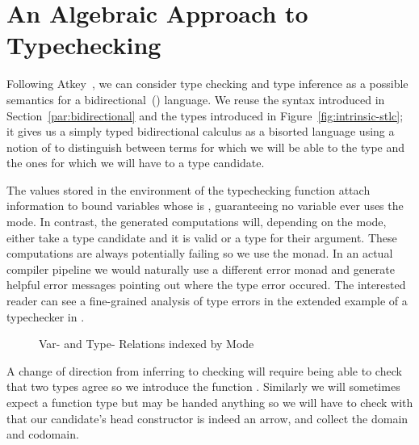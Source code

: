 \section{An Algebraic Approach to Typechecking}\label{section:typechecking}

Following Atkey~\citeyear{atkey2015algebraic}, we can consider type checking
and type inference as a possible semantics for a bidirectional~(\cite{pierce2000local})
language. We reuse the syntax introduced in Section~\ref{par:bidirectional}
and the types introduced in Figure~\ref{fig:intrinsic-stlc}; it
gives us a simply typed bidirectional calculus as a bisorted language using
a notion of  to distinguish between terms for which we will be able to
 the type and the ones for which we will have to  a type
candidate.

The values stored in the environment of the typechecking function attach 
information to bound variables whose  is , guaranteeing no
variable ever uses the  mode. In contrast, the generated computations
will, depending on the mode, either take a type candidate and  it is
valid or  a type for their argument. These computations are always
potentially failing so we use the  monad.
In an actual compiler pipeline we would naturally use a different error monad
and generate helpful error messages pointing out where the type error occured. The
interested reader can see a fine-grained analysis of type errors in the extended
example of a typechecker in \citet{DBLP:journals/jfp/McBrideM04}.

\begin{figure}[h]
\begin{minipage}[t]{0.40\textwidth}
\end{minipage}\hfill
\begin{minipage}[t]{0.50\textwidth}
\end{minipage}
\caption{Var- and Type- Relations indexed by Mode}
\end{figure}

A change of direction from inferring to checking will require being able to check
that two types agree so we introduce the function . Similarly we will
sometimes expect a function type but may be handed anything so we will have to check
with  that our candidate's head constructor is indeed an arrow, and
collect the domain and codomain.

